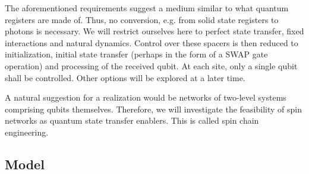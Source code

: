 \begin{center}
\end{center}

\noindent The aforementioned requirements suggest a medium similar to what quantum registers are made of. Thus, no conversion, e.g. from solid state registers to photons is necessary. We will restrict ourselves here to perfect state transfer, fixed interactions and natural dynamics. Control over these spacers is then reduced to initialization, initial state transfer (perhaps in the form of a SWAP gate operation) and processing of the received qubit. At each site, only a single qubit shall be controlled. Other options will be explored at a later time. \par
A natural suggestion for a realization would be networks of two-level systems comprising qubits themselves. Therefore, we will investigate the feasibility of spin networks as quantum state transfer enablers. This is called spin chain engineering.

\subsection{Model}

\begin{center}
\end{center}

